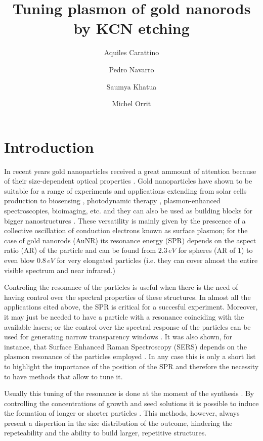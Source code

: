 \documentclass[twocolumn]{article}
\title{Tuning plasmon of gold nanorods by KCN etching}
\author{Aquiles Carattino \and Pedro Navarro \and Saumya Khatua \and Michel
Orrit}
\begin{document}
\maketitle
{}

\section{Introduction}
In recent years gold nanoparticles received a great ammount of attention because
of their size-dependent optical properties \cite{Zijlstra2011}. Gold
nanoparticles have shown to be suitable for a range of experiments and
applications extending from solar cells production \cite{Catchpole2008}
to biosensing \cite{Zijlstra2012}, photodynamic therapy \cite{Zhao2014},
plasmon-enhanced spectroscopies, bioimaging, etc. and they can also be used as
building blocks for bigger nanostructures \cite{Ivanov2011} \cite{Do2013}
\cite{Guffey2011}. These versatility is mainly given by the prescence of a
collective oscillation of conduction electrons known as surface plasmon; for the
case of gold nanorods (AuNR) its resonance energy (SPR) depends on the aspect
ratio (AR) of the particle and can be found from $2.3\,eV$ for spheres (AR of
$1$) to even blow $0.8\,eV$ for very elongated particles (i.e. they can cover
almost the entire visible spectrum and near infrared.)

Controling the resonance of the particles is useful when there is the need of
having control over the spectral properties of these structures. In almost all
the applications cited above, the SPR is critical for a succesful experiment.
Moreover, it may just be needed to have a particle with a resonance coinciding
with the available lasers; or the control over the spectral response of the
particles can be used for generating narrow transparency windows
\cite{Biswas2013}. It was also shown, for instance, that Surface
Enhanced Raman Spectroscopy (SERS) depends on the plasmon resonance of the
particles employed \cite{Sivapalan2013}. In any case this is only a short list
to highlight the importance of the position of the SPR and therefore the
necessity to have methods that allow to tune it.

Usually this tuning of the resonance is done at the moment of the
synthesis \cite{Gou2005}. By controlling the concentrations of growth and seed
solutions it is possible to induce the formation of longer or shorter
particles \cite{Nikoobakht2003}. This methods, however, always present a
dispertion in the size distribution of the outcome, hindering the repeteability
and the ability to build larger, repetitive structures.
\end{document}
